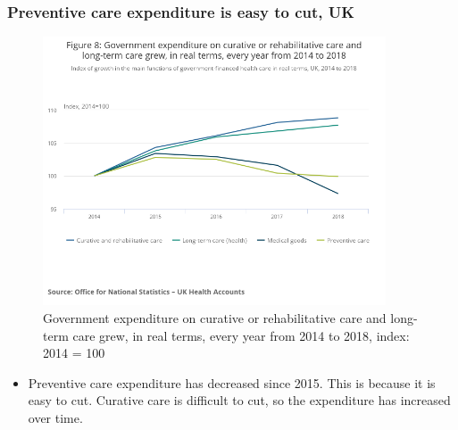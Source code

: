 \subsubsection{Preventive care expenditure is easy to cut, UK}
        \begin{figure}[H]%
                \centering
                \includegraphics[width=4in]{images/ch3/19.png}
                \caption{Government expenditure on curative or rehabilitative care and long-term care grew, in real terms, every year from 2014 to 2018, index: 2014 = 100}
                \label{fig:label}
            \end{figure}
\begin{itemize}           
        \item Preventive care expenditure has decreased since 2015. This is because it is easy to cut. Curative care is difficult to cut, so the expenditure has increased over time.
        \end{itemize} 


